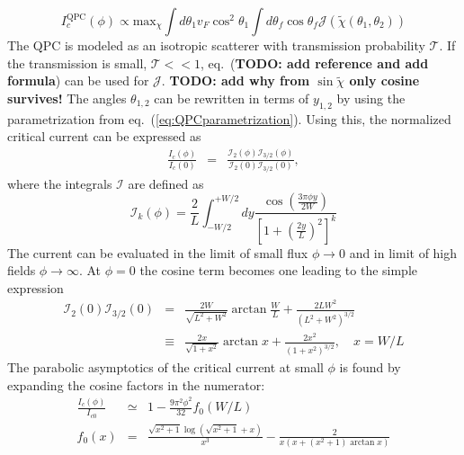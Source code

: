 \begin{equation}
I_c^{\text{QPC}}(\phi) \propto \text{max}_{\chi} \int d \theta_1 v_F \cos^2 \theta_1 \int d \theta_f \cos \theta_f \mathcal{J}\left( \tilde{\chi} (\theta_1, \theta_2) \right)
\end{equation}
The QPC is modeled as an isotropic scatterer with transmission probability $\mathcal{T}$. If the transmission is small, $\mathcal{T} << 1$, eq.~(\textbf{TODO: add reference and add formula}) can be used for $\mathcal{J}$.
\textbf{TODO: add why from $\sin \tilde{\chi}$ only cosine survives!}
The angles $\theta_{1, 2}$ can be rewritten in terms of $y_{1, 2}$ by using the parametrization from eq.~(\ref{eq:QPCparametrization}). Using this, the normalized critical current can be expressed as
\begin{eqnarray}
\frac{I_c(\phi)}{I_c(0)} &=& \frac{\mathcal{I}_2(\phi)\mathcal{I}_{3/2}(\phi)}{\mathcal{I}_2(0)\mathcal{I}_{3/2}(0)},
\end{eqnarray}
where the integrals $\mathcal{I}$ are defined as
\begin{equation}
\mathcal{I}_k(\phi) = \frac{2}{L}\int_{-W/2}^{+W/2}dy \frac{\cos\left(\frac{3\pi\phi y}{2W}\right)}{\left[1 + \left(\frac{2y}{L}\right)^2 \right]^k}
\label{integral-qpc}
\end{equation}
The current can be evaluated in the limit of small flux $\phi \rightarrow 0$ and in limit of high fields $\phi \rightarrow \infty$. 
At $\phi=0$ the cosine term becomes one leading to the simple expression
\begin{eqnarray}
\mathcal{I}_2(0)\mathcal{I}_{3/2}(0) &=&
\frac{2 W}{\sqrt{L^2+W^2}}\arctan\frac{W}{L} + \frac{2 L W^2}{(L^2+W^2)^{3/2}} \\
&\equiv& \frac{2x}{\sqrt{1 + x^2}} \arctan x + \frac{2 x^2}{\left( 1 + x^2 \right)^{3/2}}, \quad x = W/L
\label{Ic-0}
\end{eqnarray}
The parabolic asymptotics of the critical current at small $\phi$ is found by expanding the cosine factors in the numerator:
\begin{eqnarray}
\frac{I_c(\phi)}{I_{c0}}&\simeq& 1 - \frac{9\pi ^2 \phi^2 }{32} f_0(W/L) \\
f_0(x) &=& \frac{\sqrt{x^2+1} \log \left(\sqrt{x^2+1}+x\right)}{x^3} - \frac{2}{x (x+(x^2+1) \arctan x)} 
\end{eqnarray}
